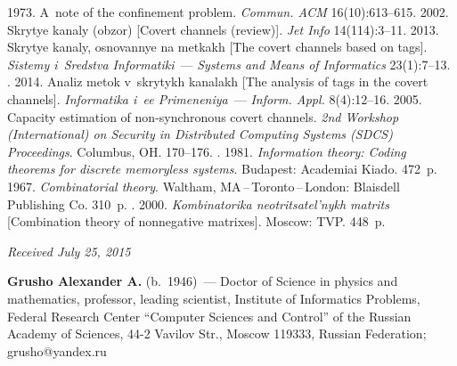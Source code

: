   \begin{multicols}{2}

\renewcommand{\bibname}{\protect\rmfamily References}

{\small\frenchspacing
 {%
 \begin{thebibliography}{9}
     1973. A~note of the confinement problem. 
\textit{Commun. ACM} 16(10):613--615.
     2002. Skrytye kanaly (obzor) [Covert channels (review)]. 
\textit{Jet Info} 14(114):3--11.
     2013. Skrytye kanaly, osnovannye na metkakh [The covert 
channels based on tags]. \textit{Sistemy i~Sredstva Informatiki}~--- \textit{Systems 
and Means of Informatics} 23(1):7--13.
    . 2014. Analiz metok 
v~skrytykh kanalakh [The analysis of tags in the covert channels]. \textit{Informatika 
i~ee Primeneniya}~--- \textit{Inform. Appl.} 8(4):12--16.
     2005.  Capacity estimation of  
non-synchronous covert channels. \textit{2nd Workshop (International) on Security in 
Distributed Computing Systems (SDCS) Proceedings}. Columbus, OH. 170--176. 
    . 1981. \textit{Information theory: Coding 
theorems for discrete memoryless systems}. Budapest: Academiai Kiado. 472~p.
     1967. \textit{Combinatorial theory}. Waltham,
    MA\,--\,Toronto\,--\,London: Blaisdell Publishing Co. 310~p. 
    . 2000. \textit{Kombinatorika 
neotritsatel'nykh matrits} [Combination theory of nonnegative matrixes]. Moscow: 
TVP. 448~p.
\end{thebibliography}

 }
 }

\end{multicols}

\vspace*{-3pt}

\hfill{\small\textit{Received July 25, 2015}}
    
    \Contr
    
    \noindent
\textbf{Grusho Alexander A.} (b.\ 1946)~--- 
Doctor of Science in physics and mathematics, professor, leading scientist, Institute of 
Informatics Problems, Federal Research Center ``Computer Sciences and Control'' of the 
Russian Academy of Sciences,
44-2 Vavilov 
    Str., Moscow 119333, Russian Federation;  grusho@yandex.ru

